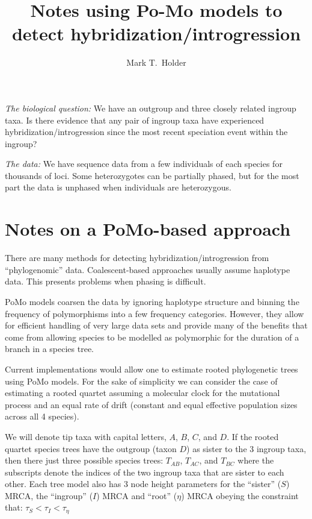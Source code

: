 \documentclass{article}
\title{Notes using Po-Mo models to detect hybridization/introgression}
\author{Mark T.~Holder}
\begin{document}
\maketitle

{\em The biological question:} We have an outgroup and three closely related ingroup taxa. Is there evidence that any pair of ingroup taxa have experienced hybridization/introgression since the most recent speciation event within the ingroup?

{\em The data:} We have sequence data from a few individuals of each species for thousands of loci.  Some heterozygotes can be partially phased, but for the most part the data is unphased when individuals are heterozygous.

\section{Notes on a PoMo-based approach}
There are many methods for detecting hybridization/introgression \citep{HibbinsHahn2021,HibbinsHahn2022} from ``phylogenomic'' data.
Coalescent-based approaches usually assume haplotype data.
This presents problems when phasing is difficult.

PoMo models \citep[see][and references therein]{DemaioSK2015,schrempf2016reversible,borges2020consistency} coarsen 
the data by ignoring haplotype structure and binning the frequency of polymorphisms into a few frequency categories.
However, they allow for efficient handling of very large data sets and provide many of the benefits that come from allowing 
species to be modelled as polymorphic for the duration of a branch in a species tree.

Current implementations would allow one to estimate rooted phylogenetic trees using PoMo models.
For the sake of simplicity we can consider the case of estimating a rooted quartet assuming a molecular clock for the mutational process and an equal rate of drift (constant and equal effective population sizes across all 4 species).

We will denote tip taxa with capital letters, $A$, $B$, $C$, and $D$.
If the rooted quartet species trees have the outgroup (taxon $D$) as sister to the 3 ingroup taxa, then there just three
possible species trees: $T_{AB}$, $T_{AC}$, and $T_{BC}$ where the subscripts denote the indices of the two ingroup
taxa that are sister to each other.
Each tree model also has 3 node height parameters for the ``sister'' ($S$) MRCA, the ``ingroup'' ($I$) MRCA and ``root'' ($\eta$) MRCA obeying the constraint that: $\tau_S < \tau_I < \tau_\eta$
\end{document}
